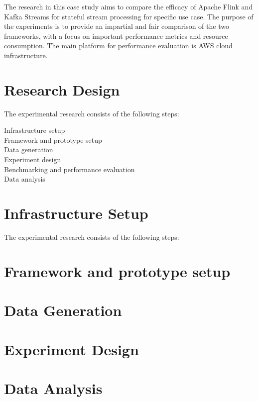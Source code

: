 The research in this case study aims to compare the
efficacy of Apache Flink and Kafka Streams for stateful stream processing for specific use case.
The purpose of the experiments is to provide an impartial
and fair comparison of the two frameworks, with a focus
on important performance metrics and resource consumption.
The main platform for performance evaluation is AWS cloud infrastructure.

\section{Research Design}\label{sec:research-design}
The experimental research consists of the following steps:

\begin{description}
    \item[Infrastructure setup]
    \item[Framework and prototype setup]
    \item[Data generation] 
    \item[Experiment design]
    \item[Benchmarking and performance evaluation]
    \item[Data analysis]
\end{description}


\section{Infrastructure Setup}\label{sec:infrastructure-setup}
The experimental research consists of the following steps:


\section{Framework and prototype setup}\label{sec:framework-and-prototype-setup}


\section{Data Generation}\label{sec:data-generation}


\section{Experiment Design}\label{sec:experiment-design}


\section{Data Analysis}\label{sec:data-analysis}